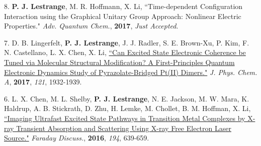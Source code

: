 


\begin{cvpublications}




\cvpublication
{8.} 
{\textbf{P. J. Lestrange}, M. R. Hoffmann, X. Li, ``Time-dependent Configuration Interaction using the Graphical Unitary Group Approach: Nonlinear Electric Properties." \textit{Adv. Quantum Chem.}, \textbf{2017}, \textit{Just Accepted}.} 


\cvpublication
{7.} 
{D. B. Lingerfelt, \textbf{P. J. Lestrange}, J. J. Radler, S. E. Brown-Xu, P. Kim, F. N. Castellano, L. X. Chen, X. Li, \href{http://pubs.acs.org/doi/abs/10.1021/acs.jpca.6b12099}{``Can Excited State Electronic Coherence be Tuned via Molecular Structural Modification? A First-Principles Quantum Electronic Dynamics Study of Pyrazolate-Bridged Pt(II) Dimers."} \textit{J. Phys. Chem. A}, \textbf{2017}, \textit{121}, 1932-1939.} 


\cvpublication
{6.} 
{L. X. Chen, M. L. Shelby, \textbf{P. J. Lestrange}, N. E. Jackson, M. W. Mara, K. Haldrup, A. B. Stickrath, D. Zhu, H. Lemke, M. Chollet, B. M. Hoffman, X. Li,  \href{http://pubs.rsc.org/en/Content/ArticleLanding/2016/FD/C6FD00083E}{``Imaging Ultrafast Excited State Pathways in Transition Metal Complexes by X-ray Transient Absorption and Scattering Using X-ray Free Electron Laser Source."} \textit{Faraday Discuss.}, \textbf{2016}, \textit{194}, 639-659.} 



\end{cvpublications}
